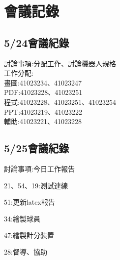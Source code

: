 \chapter{會議記錄}


\section{5/24會議紀錄}


討論事項:分配工作、討論機器人規格\\


工作分配:\\
畫圖:41023234、41023247\\
PDF:41023228、41023251\\
程式:41023228、41023251、41023254\\
PPT:41023219、41023222\\
輔助:41023221、41023228\\


\section{5/25會議紀錄}

討論事項:今日工作報告

21、54、19:測試連線

51:更新latex報告

34:繪製球員

47:繪製計分裝置

28:督導、協助


	